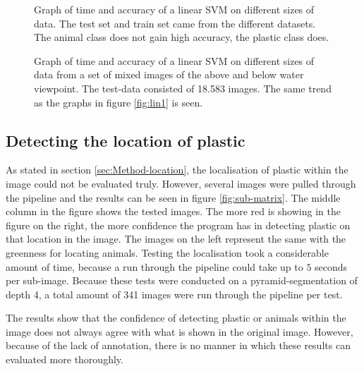 \ifx\showmixi\undefined
\begin{figure}%
\centering
\ifx\showfig\undefined
 \fi
\caption{Graph of time and accuracy of a linear SVM on different sizes of data. The test set and train set came from the different datasets. The animal class does not gain high accuracy, the plastic class does.}
\label{fig:lin3}
\end{figure}
\fi

\begin{figure}%
\centering
\ifx\showfig\undefined
 \fi
\caption{Graph of time and accuracy of a linear SVM on different sizes of data from a set of mixed images of the above and below water viewpoint. The test-data consisted of 18.583 images. The same trend as the graphs in figure \ref{fig:lin1} is seen.}
\label{fig:lin2}
\end{figure}

\subsection{Detecting the location of plastic}
\label{sec:Results-location}
As stated in section \ref{sec:Method-location}, the localisation of plastic within the image could not be evaluated truly.
However, several images were pulled through the pipeline and the results can be seen in figure \ref{fig:sub-matrix}.
The middle column in the figure shows the tested images.
The more red is showing in the figure on the right, the more confidence the program has in detecting plastic on that location in the image.
The images on the left represent the same with the greenness for locating animals.
Testing the localisation took a considerable amount of time, because a run through the pipeline could take up to $5$ seconds per sub-image.
Because these tests were conducted on a pyramid-segmentation of depth 4, a total amount of 341 images were run through the pipeline per test.

The results show that the confidence of detecting plastic or animals within the image does not always agree with what is shown in the original image.
However, because of the lack of annotation, there is no manner in which these results can evaluated more thoroughly.

